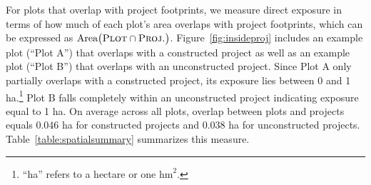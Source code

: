 \documentclass[12pt]{article}
\newcommand{\hmref}{
	``hm'' refers to a hectometer or 100 meters.
}
\newcommand{\haref}{
	``ha'' refers to a hectare or one $\text{hm}^{2}$.
}
\begin{document}
For plots that overlap with project footprints, we measure direct exposure in terms of how much of each plot's area overlaps with project footprints, which can be expressed as $\text{Area}\big(\textsc{Plot}  \cap  \textsc{Proj.}\big)$.  Figure~\ref{fig:insideproj} includes an example plot (``Plot A'') that overlaps with a constructed project as well as an example plot (``Plot B'') that overlaps with an unconstructed project.  Since Plot A only partially overlaps with a constructed project, its exposure lies between 0 and 1 ha.\footnote{\haref}  Plot B falls completely within an unconstructed project indicating exposure equal to 1 ha.  On average across all plots, overlap between plots and projects equals 0.046 ha for constructed projects and 0.038 ha for unconstructed projects. Table~\ref{table:spatialsummary} summarizes this measure.


% 
% 
\end{document}
